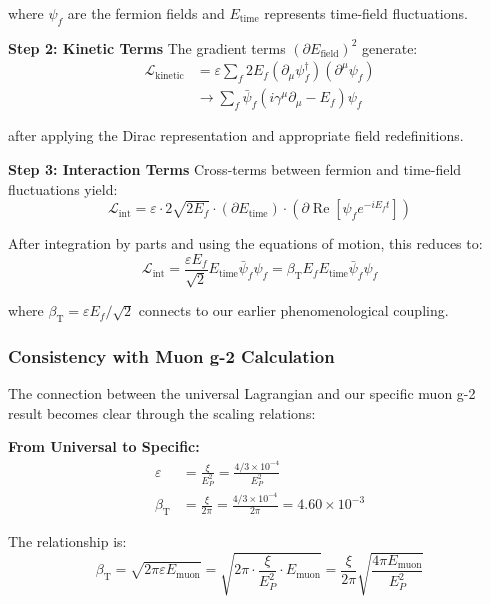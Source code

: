 \documentclass[12pt,a4paper]{article}
\newcommand{\betaT}{\beta_{\text{T}}}
\begin{document}
	where $\psi_f$ are the fermion fields and $E_{\text{time}}$ represents time-field fluctuations.
	
	\textbf{Step 2: Kinetic Terms}
	The gradient terms $(\partial E_{\text{field}})^2$ generate:
	\begin{align}
		\mathcal{L}_{\text{kinetic}} &= \varepsilon \sum_f 2E_f (\partial_\mu \psi_f^\dagger)(\partial^\mu \psi_f) \\
		&\rightarrow \sum_f \bar{\psi}_f (i\gamma^\mu \partial_\mu - E_f) \psi_f
	\end{align}
	
	after applying the Dirac representation and appropriate field redefinitions.
	
	\textbf{Step 3: Interaction Terms}
	Cross-terms between fermion and time-field fluctuations yield:
	\begin{equation}
		\mathcal{L}_{\text{int}} = \varepsilon \cdot 2\sqrt{2E_f} \cdot (\partial E_{\text{time}}) \cdot (\partial \operatorname{Re}[\psi_f e^{-iE_f t}])
	\end{equation}
	
	After integration by parts and using the equations of motion, this reduces to:
	\begin{equation}
		\mathcal{L}_{\text{int}} = \frac{\varepsilon E_f}{\sqrt{2}} E_{\text{time}} \bar{\psi}_f \psi_f = \betaT E_f E_{\text{time}} \bar{\psi}_f \psi_f
	\end{equation}
	
	where $\betaT = \varepsilon E_f/\sqrt{2}$ connects to our earlier phenomenological coupling.
	
	\subsubsection{Consistency with Muon g-2 Calculation}
	
	The connection between the universal Lagrangian and our specific muon g-2 result becomes clear through the scaling relations:
	
	\textbf{From Universal to Specific:}
	\begin{align}
		\varepsilon &= \frac{\xi}{E_P^2} = \frac{4/3 \times 10^{-4}}{E_P^2} \\
		\betaT &= \frac{\xi}{2\pi} = \frac{4/3 \times 10^{-4}}{2\pi} = 4.60 \times 10^{-3}
	\end{align}
	
	The relationship is:
	\begin{equation}
		\betaT = \sqrt{2\pi \varepsilon E_{\text{muon}}} = \sqrt{2\pi \cdot \frac{\xi}{E_P^2} \cdot E_{\text{muon}}} = \frac{\xi}{2\pi} \sqrt{\frac{4\pi E_{\text{muon}}}{E_P^2}}
	\end{equation}
	
\end{document}
